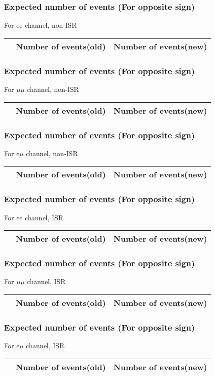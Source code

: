 \begin{frame}
\frametitle{Expected number of events (For opposite sign)}
For ee channel, non-ISR\\
\vspace{5mm}
\begin{tabular}{|c|c|c|}
\hline
& Number of events(old) & Number of events(new) \\
\hline

\end{tabular}
\end{frame}

\begin{frame}
\frametitle{Expected number of events (For opposite sign)}
For $\mu\mu$ channel, non-ISR\\
\vspace{5mm}
\begin{tabular}{|c|c|c|}
\hline
& Number of events(old) & Number of events(new) \\
\hline

\end{tabular}
\end{frame}

\begin{frame}
\frametitle{Expected number of events (For opposite sign)}
For e$\mu$ channel, non-ISR\\
\vspace{5mm}
\begin{tabular}{|c|c|c|}
\hline
& Number of events(old) & Number of events(new) \\
\hline

\end{tabular}
\end{frame}

\begin{frame}
\frametitle{Expected number of events (For opposite sign)}
For ee channel, ISR\\
\vspace{5mm}
\begin{tabular}{|c|c|c|}
\hline
& Number of events(old) & Number of events(new) \\
\hline

\end{tabular}
\end{frame}

\begin{frame}
\frametitle{Expected number of events (For opposite sign)}
For $\mu\mu$ channel, ISR\\
\vspace{5mm}
\begin{tabular}{|c|c|c|}
\hline
& Number of events(old) & Number of events(new) \\
\hline

\end{tabular}
\end{frame}

\begin{frame}
\frametitle{Expected number of events (For opposite sign)}
For e$\mu$ channel, ISR\\
\vspace{5mm}
\begin{tabular}{|c|c|c|}
\hline
& Number of events(old) & Number of events(new) \\
\hline

\end{tabular}
\end{frame}

